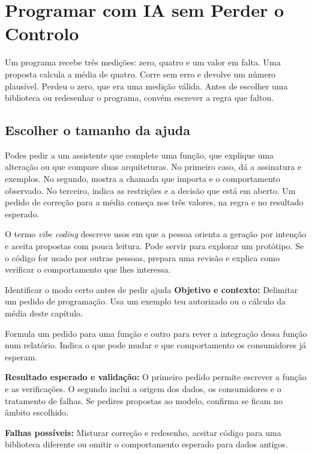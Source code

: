 \chapter{Programar com IA sem Perder o Controlo}
\label{ch:software}

Um programa recebe três medições: zero, quatro e um valor em falta. Uma proposta calcula a média de quatro. Corre sem erro e devolve um número plausível. Perdeu o zero, que era uma medição válida. Antes de escolher uma biblioteca ou redesenhar o programa, convém escrever a regra que faltou.

\section{Escolher o tamanho da ajuda}

Podes pedir a um assistente que complete uma função, que explique uma alteração ou que compare duas arquiteturas. No primeiro caso, dá a assinatura e exemplos. No segundo, mostra a chamada que importa e o comportamento observado. No terceiro, indica as restrições e a decisão que está em aberto. Um pedido de correção para a média começa nos três valores, na regra e no resultado esperado.

O termo \emph{vibe coding} descreve usos em que a pessoa orienta a geração por intenção e aceita propostas com pouca leitura. Pode servir para explorar um protótipo. Se o código for usado por outras pessoas, prepara uma revisão e explica como verificar o comportamento que lhes interessa.

\begin{promptlabbox}{Identificar o modo certo antes de pedir ajuda}
\textbf{Objetivo e contexto:} Delimitar um pedido de programação. Usa um exemplo teu autorizado ou o cálculo da média deste capítulo.

Formula um pedido para uma função e outro para rever a integração dessa função num relatório. Indica o que pode mudar e que comportamento os consumidores já esperam.

\textbf{Resultado esperado e validação:} O primeiro pedido permite escrever a função e as verificações. O segundo inclui a origem dos dados, os consumidores e o tratamento de falhas. Se pedires propostas ao modelo, confirma se ficam no âmbito escolhido.

\textbf{Falhas possíveis:} Misturar correção e redesenho, aceitar código para uma biblioteca diferente ou omitir o comportamento esperado para dados antigos.
\end{promptlabbox}

